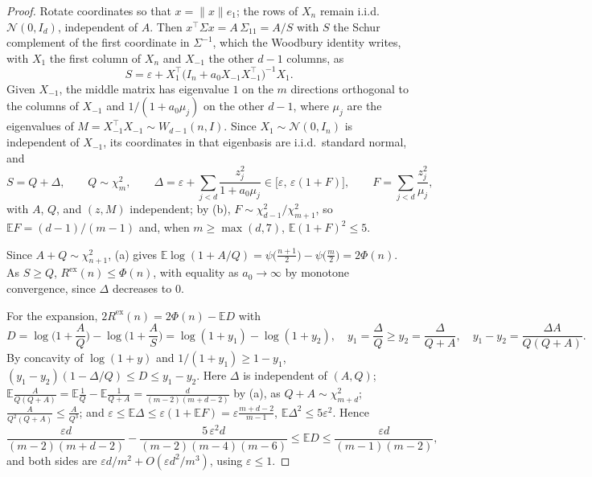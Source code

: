 \documentclass[10pt]{article}
\newcommand{\E}{\mathbb{E}}
\begin{document}
\begin{proof}
Rotate coordinates so that $x = \|x\| e_1$; the rows of $X_n$ remain i.i.d.\ $\mathcal{N}(0, I_d)$, independent of $A$. Then $x^\top \Sigma x = A\,\Sigma_{11} = A/S$ with $S$ the Schur complement of the first coordinate in $\Sigma^{-1}$, which the Woodbury identity writes, with $X_1$ the first column of $X_n$ and $X_{-1}$ the other $d-1$ columns, as
\[
S = \varepsilon + X_1^\top \big(I_n + a_0 X_{-1} X_{-1}^\top\big)^{-1} X_1 .
\]
Given $X_{-1}$, the middle matrix has eigenvalue $1$ on the $m$ directions orthogonal to the columns of $X_{-1}$ and $1/(1 + a_0 \mu_j)$ on the other $d - 1$, where $\mu_j$ are the eigenvalues of $M = X_{-1}^\top X_{-1} \sim W_{d-1}(n, I)$. Since $X_1 \sim \mathcal{N}(0, I_n)$ is independent of $X_{-1}$, its coordinates in that eigenbasis are i.i.d.\ standard normal, and
\[
S = Q + \Delta, \qquad Q \sim \chi^2_m, \qquad
\Delta = \varepsilon + \sum_{j < d} \frac{z_j^2}{1 + a_0 \mu_j} \in \big[\varepsilon,\, \varepsilon(1 + F)\big], \qquad F = \sum_{j < d} \frac{z_j^2}{\mu_j},
\]
with $A$, $Q$, and $(z, M)$ independent; by (b), $F \sim \chi^2_{d-1} / \chi^2_{m+1}$, so $\E F = (d-1)/(m-1)$ and, when $m \ge \max(d, 7)$, $\E (1+F)^2 \le 5$.

Since $A + Q \sim \chi^2_{n+1}$, (a) gives $\E \log(1 + A/Q) = \psi\big(\tfrac{n+1}{2}\big) - \psi\big(\tfrac{m}{2}\big) = 2\Phi(n)$. As $S \ge Q$, $R^{\mathrm{ex}}(n) \le \Phi(n)$, with equality as $a_0 \to \infty$ by monotone convergence, since $\Delta$ decreases to $0$.

For the expansion, $2R^{\mathrm{ex}}(n) = 2\Phi(n) - \E D$ with
\[
D = \log\Big(1 + \frac{A}{Q}\Big) - \log\Big(1 + \frac{A}{S}\Big) = \log(1 + y_1) - \log(1 + y_2), \quad y_1 = \frac{\Delta}{Q} \ge y_2 = \frac{\Delta}{Q + A}, \quad y_1 - y_2 = \frac{\Delta A}{Q(Q+A)} .
\]
By concavity of $\log(1+y)$ and $1/(1+y_1) \ge 1 - y_1$, $(y_1 - y_2)(1 - \Delta/Q) \le D \le y_1 - y_2$. Here $\Delta$ is independent of $(A, Q)$; $\E \frac{A}{Q(Q+A)} = \E\frac1Q - \E\frac{1}{Q+A} = \frac{d}{(m-2)(m+d-2)}$ by (a), as $Q + A \sim \chi^2_{m+d}$; $\frac{A}{Q^2(Q+A)} \le \frac{A}{Q^3}$; and $\varepsilon \le \E\Delta \le \varepsilon(1 + \E F) = \varepsilon\frac{m+d-2}{m-1}$, $\E \Delta^2 \le 5\varepsilon^2$. Hence
\[
\frac{\varepsilon d}{(m-2)(m+d-2)} - \frac{5\,\varepsilon^2 d}{(m-2)(m-4)(m-6)} \le \E D \le \frac{\varepsilon d}{(m-1)(m-2)} ,
\]
and both sides are $\varepsilon d / m^2 + O(\varepsilon d^2 / m^3)$, using $\varepsilon \le 1$.
\end{proof}
\end{document}
